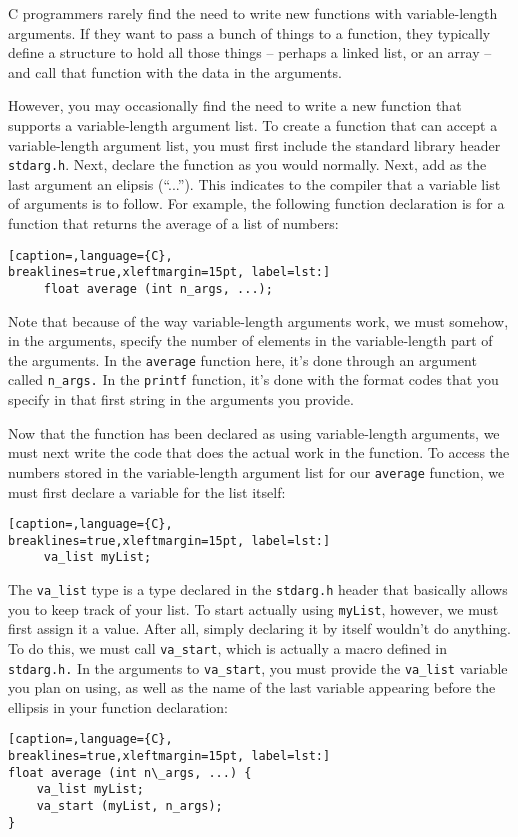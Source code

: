 C programmers rarely find the need to write new functions with variable-length
arguments.  If they want to pass a bunch of things to a function, they
typically define a structure to hold all those things -- perhaps a linked list,
or an array -- and call that function with the data in the arguments.

However, you may occasionally find the need to write a new function that
supports a variable-length argument list.  To create a function that can accept
a variable-length argument list, you must first include the standard library
header \texttt{stdarg.h}. Next, declare the function as you would normally.
Next, add as the last argument an elipsis (``...''). This indicates to the
compiler that a variable list of arguments is to follow. For example, the
following function declaration is for a function that returns the average of a
list of numbers:
\lstset{basicstyle=\scriptsize, numbers=left, captionpos=b, tabsize=4}
\begin{lstlisting}[caption=,language={C},
breaklines=true,xleftmargin=15pt, label=lst:]
	 float average (int n_args, ...);
\end{lstlisting}

Note that because of the way variable-length arguments work, we must somehow,
in the arguments, specify the number of elements in the variable-length part of
the arguments. In the \texttt{average} function here, it's done through an
argument called \texttt{n\_args.} In the \texttt{printf} function, it's done
with the format codes that you specify in that first string in the arguments
you provide.

Now that the function has been declared as using variable-length arguments, we
must next write the code that does the actual work in the function.  To access
the numbers stored in the variable-length argument list for our
\texttt{average} function, we must first declare a variable for the list
itself:
\lstset{basicstyle=\scriptsize, numbers=left, captionpos=b, tabsize=4}
\begin{lstlisting}[caption=,language={C},
breaklines=true,xleftmargin=15pt, label=lst:]
	 va_list myList;
\end{lstlisting}

The \texttt{va\_list} type is a type declared in the \texttt{stdarg.h} header
that basically allows you to keep track of your list. To start actually using
\texttt{myList}, however, we must first assign it a value. After all, simply
declaring it by itself wouldn't do anything. To do this, we must call
\texttt{va\_start}, which is actually a macro defined in \texttt{stdarg.h.} In
the arguments to \texttt{va\_start}, you must provide the \texttt{va\_list}
variable you plan on using, as well as the name of the last variable appearing
before the ellipsis in your function declaration:
\lstset{basicstyle=\scriptsize, numbers=left, captionpos=b, tabsize=4}
\begin{lstlisting}[caption=,language={C},
breaklines=true,xleftmargin=15pt, label=lst:]
float average (int n\_args, ...) {
	va_list myList;
	va_start (myList, n_args);
}
\end{lstlisting}

